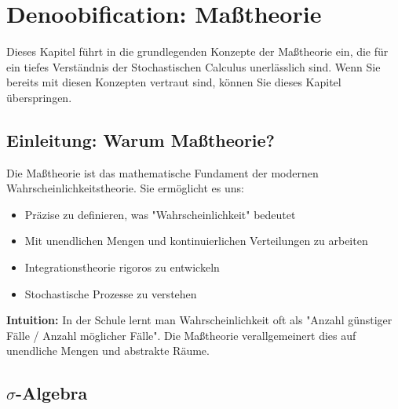 \chapter{Denoobification: Maßtheorie}

Dieses Kapitel führt in die grundlegenden Konzepte der Maßtheorie ein, die für ein tiefes Verständnis der Stochastischen Calculus unerlässlich sind. Wenn Sie bereits mit diesen Konzepten vertraut sind, können Sie dieses Kapitel überspringen.

\section{Einleitung: Warum Maßtheorie?}

Die Maßtheorie ist das mathematische Fundament der modernen Wahrscheinlichkeitstheorie. Sie ermöglicht es uns:
\begin{itemize}
    \item Präzise zu definieren, was "Wahrscheinlichkeit" bedeutet
    \item Mit unendlichen Mengen und kontinuierlichen Verteilungen zu arbeiten
    \item Integrationstheorie rigoros zu entwickeln
    \item Stochastische Prozesse zu verstehen
\end{itemize}

\textbf{Intuition:} In der Schule lernt man Wahrscheinlichkeit oft als "Anzahl günstiger Fälle / Anzahl möglicher Fälle". Die Maßtheorie verallgemeinert dies auf unendliche Mengen und abstrakte Räume.

\section{\texorpdfstring{$\sigma$-Algebra}{sigma-Algebra}}

